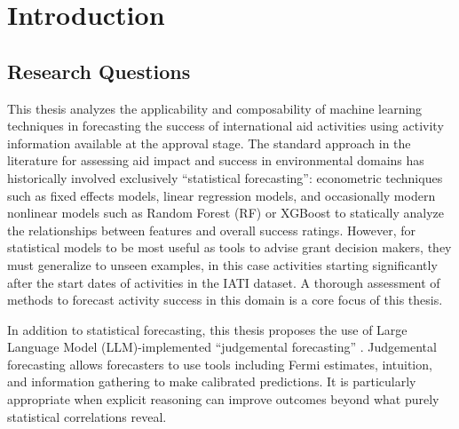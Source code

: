 \documentclass[12pt,a4paper]{article}
\let\citep\parencite
\begin{document}
\clearpage

\setcounter{page}{1}
\tableofcontents
\clearpage

\setcounter{page}{1}

















\section{Introduction}
\subsection{Research Questions}

This thesis analyzes the applicability and composability of machine learning techniques in forecasting the success of international aid activities using activity information available at the approval stage. The standard approach in the literature for assessing aid impact and success in environmental domains has historically involved exclusively ``statistical forecasting'': econometric techniques such as fixed effects models, linear regression models, and occasionally modern nonlinear models such as Random Forest (RF) or XGBoost \citep{goldembergMindingGapAid2025} to statically analyze the relationships between features and overall success ratings. However, for statistical models to be most useful as tools to advise grant decision makers, they must generalize to unseen examples, in this case activities starting significantly after the start dates of activities in the IATI dataset. A thorough assessment of methods to forecast activity success in this domain is a core focus of this thesis.

In addition to statistical forecasting, this thesis proposes the use of Large Language Model (LLM)-implemented ``judgemental forecasting'' \citep{halawiApproachingHumanLevelForecasting2024}. Judgemental forecasting allows forecasters to use tools including Fermi estimates, intuition, and information gathering to make calibrated predictions. It is particularly appropriate when explicit reasoning can improve outcomes beyond what purely statistical correlations reveal.
\end{document}
